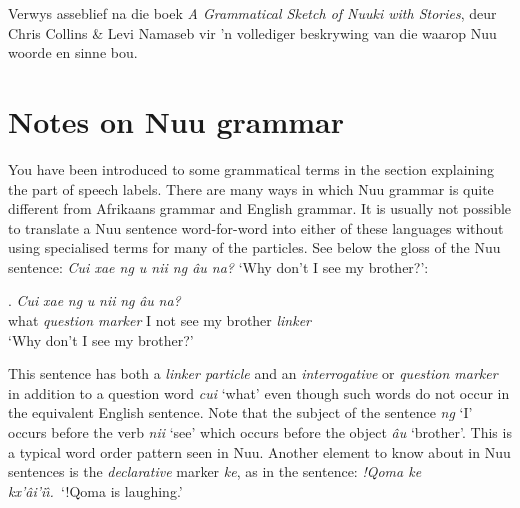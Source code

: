 Verwys asseblief na die boek \emph{A Grammatical Sketch of
N\textipa{\textvertline}uuki with Stories}, deur Chris Collins \& Levi
Namaseb vir 'n vollediger beskrywing van die waarop
N\textipa{\textvertline}uu woorde en sinne bou.


\markboth{}{}
\addtocounter{section}{-1}
\tocless\section{Notes on N\textipa{\textvertline}uu grammar}
{}
\markboth{}{}

You have been introduced to some grammatical terms in the section
explaining the part of speech labels. There are many ways in which
N\textipa{\textvertline}uu grammar is quite different from Afrikaans
grammar and English grammar. It is usually not possible to translate a
N\textipa{\textvertline}uu sentence word-for-word into either of these
languages without using specialised terms for many of the particles.
See below the gloss of the N\textipa{\textvertline}uu sentence:
\emph{Cui xae ng \textipa{\textdoublevertline}u
n\textipa{\textvertline}ii ng \textipa{\textdoublevertline}\^{a}u
n\textipa{\textdoublevertline}a?} `Why don't I see my brother?':

\addtocounter{ExNo}{-1}
\exg.
\emph{Cui} \emph{xae} \emph{ng} \emph{\textipa{\textdoublevertline}u}
\emph{n\textipa{\textvertline}ii} \emph{ng}
\emph{\textipa{\textdoublevertline}\^{a}u}
\emph{n\textipa{\textdoublevertline}a?}\\
what \emph{question marker} I not see my brother \emph{linker}\\
`Why don't I see my brother?' \parencite[66, example 31]{Collins2011}

This sentence has both a \emph{linker particle} and an
\emph{interrogative} or \emph{question marker} in addition to a
question word \emph{cui} `what' even though such words do not occur in
the equivalent English sentence. Note that the subject of the sentence
\emph{ng} `I' occurs before the verb \emph{n\textipa{\textvertline}ii}
`see' which occurs before the object
\emph{\textipa{\textdoublevertline}\^{a}u} `brother'. This is a
typical word order pattern seen in N\textipa{\textvertline}uu. Another
element to know about in N\textipa{\textvertline}uu sentences is the
\emph{declarative} marker \emph{ke}, as in the sentence: \emph{!Qoma
ke kx'\^{a}i'i\^{\i}.}\ `!Qoma is laughing.'\\


